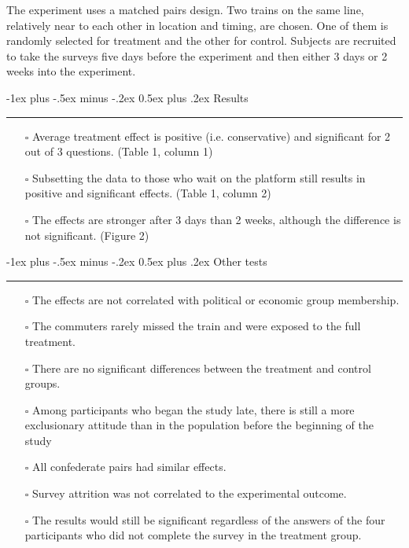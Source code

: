 \documentclass[10pt,landscape]{article}
\makeatletter
\renewcommand{\section}{\@startsection{section}{1}{0mm}%
                                {-1ex plus -.5ex minus -.2ex}%
                                {0.5ex plus .2ex}%
                                {\normalfont\Large\bfseries}}
\makeatother
\begin{document}
\begin{multicols*}{2}
The experiment uses a matched pairs design. Two trains on the same line, relatively near to each other in location and timing, are chosen. One of them is randomly selected for treatment and the other for control. Subjects are recruited to take the surveys five days before the experiment and then either 3 days or 2 weeks into the experiment.

\section{Results} \smallskip \hrule height 2pt \medskip

   \small 
   \begin{itemize}
     \item[$\square$] Average treatment effect is positive (i.e. conservative) and significant for 2 out of 3 questions. (Table 1, column 1)
     \item[$\square$] Subsetting the data to those who wait on the platform still results in positive and significant effects. (Table 1, column 2)
     \item[$\square$] The effects are stronger after 3 days than 2 weeks, although the difference is not significant. (Figure 2)
       
   \end{itemize}

\section{Other tests} \smallskip \hrule height 2pt \medskip

   \small
   \begin{itemize}
   
        \item[$\square$] The effects are not correlated with political or economic group membership. 
        \item[$\square$] The commuters rarely missed the train and were exposed to the full treatment.
        \item[$\square$] There are no significant differences between the treatment and control groups.
        \item[$\square$] Among participants who began the study late, there is still a more exclusionary attitude than in the population before the beginning of the study
        \item[$\square$] All confederate pairs had similar effects.
        \item[$\square$] Survey attrition was not correlated to the experimental outcome.
        \item[$\square$] The results would still be significant regardless of the answers of the four participants who did not complete the survey in the treatment group.
   

\end{itemize}
\end{multicols*}
\end{document}

